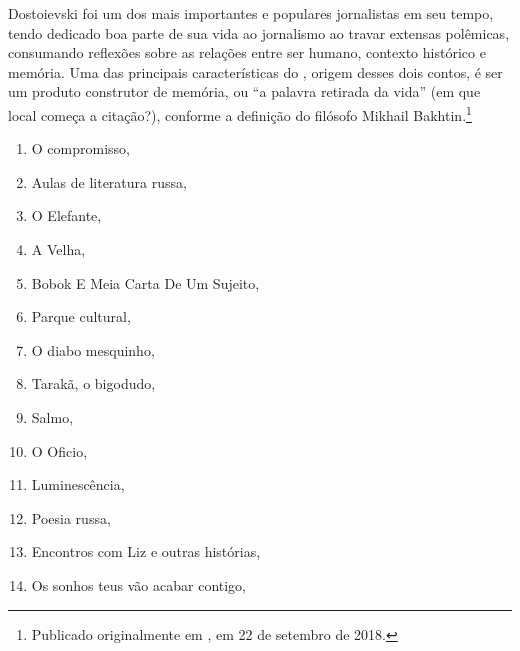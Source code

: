 \begin{changemargin}
Dostoievski foi um dos mais importantes e populares jornalistas em seu tempo, tendo dedicado boa parte de sua vida ao jornalismo ao travar extensas polêmicas, consumando reflexões sobre as relações entre ser humano, contexto histórico e memória. Uma das principais características do {}, origem desses dois contos, é ser um produto construtor de memória, ou “a palavra retirada da vida” (em que local começa a citação?), conforme a definição do filósofo Mikhail Bakhtin.\footnote{Publicado originalmente em {}, em 22 de setembro de 2018.}

\pagebreak
\end{changemargin}
\pagebreak

\pagebreak
\pagestyle{kalinkacat}

\begin{multicols}{2}
\begin{enumerate}
\item O compromisso, {}
\item Aulas de literatura russa, {}
\item O Elefante, {}
\item A Velha, {}
\item Bobok E Meia Carta De Um Sujeito, {}
\item Parque cultural, {}
\item O diabo mesquinho, {}
\item Tarakã, o bigodudo, {}
\item Salmo, {}
\item O Oficio, {}
\item Luminescência, {}
\item Poesia russa, {}
\item Encontros com Liz e outras histórias, {}
\item Os sonhos teus vão acabar contigo, {}
\end{enumerate}
\end{multicols}

\pagebreak




